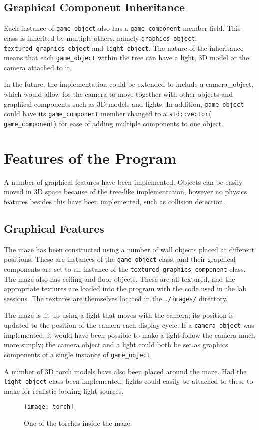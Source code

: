 \documentclass{article}
\begin{document}
	\subsection{Graphical Component Inheritance}
	Each instance of \texttt{game\_object} also has a \texttt{game\_component} member field.
	This class is inherited by multiple others, namely \texttt{graphics\_object}, \texttt{textured\_graphics\_object} and \texttt{light\_object}.
	The nature of the inheritance means that each \texttt{game\_object} within the tree can have a light, 3D model or the camera attached to it.
	\par
	In the future, the implementation could be extended to include a camera\_object, which would allow for the camera to move together with other objects and graphical components such as 3D models and lights.
	In addition, \texttt{game\_object} could have its \texttt{game\_component} member changed to a \texttt{std::vector$\langle$game\_component$\rangle$} for ease of adding multiple components to one object.
	
	\newpage
	\section{Features of the Program}
	A number of graphical features have been implemented. Objects can be easily moved in 3D space because of the tree-like implementation, however no physics features besides this have been implemented, such as collision detection.
	\subsection{Graphical Features}
	The maze has been constructed using a number of wall objects placed at different positions.
	These are instances of the \texttt{game\_object} class, and their graphical components are set to an instance of the \texttt{textured\_graphics\_component} class.
	The maze also has ceiling and floor objects. These are all textured, and the appropriate textures are loaded into the program with the code used in the lab sessions. The textures are themselves located in the \texttt{./images/} directory.
	\par
	The maze is lit up using a light that moves with the camera; its position is updated to the position of the camera each display cycle. If a \texttt{camera\_object} was implemented, it would have been possible to make a light follow the camera much more simply; the camera object and a light could both be set as graphics components of a single instance of \texttt{game\_object}.
	\par
	A number of 3D torch models have also been placed around the maze. Had the \texttt{light\_object} class been implemented, lights could easily be attached to these to make for realistic looking light sources.
	\begin{figure}[h]
	\texttt{[image: torch]}
	\caption{One of the torches inside the maze.}
	\end{figure}
\end{document}
